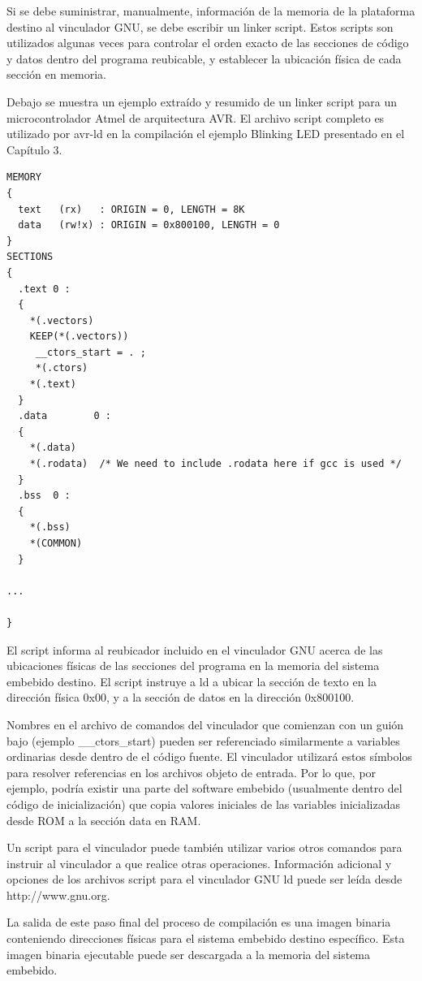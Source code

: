 \documentclass[12pt]{article}
\begin{document}
Si se debe suministrar, manualmente, información de la memoria de la plataforma destino
al vinculador  GNU, se debe escribir un linker script.
Estos scripts son utilizados algunas veces para controlar el orden exacto de
las secciones de código y datos dentro del programa reubicable, y establecer
la ubicación física de cada sección en memoria.


Debajo se muestra un ejemplo extraído y resumido de un linker script
para un microcontrolador Atmel de arquitectura AVR. El archivo script
completo es utilizado por avr-ld en la compilación el ejemplo Blinking LED
presentado en el Capítulo 3.

\begin{verbatim}
MEMORY
{
  text   (rx)   : ORIGIN = 0, LENGTH = 8K
  data   (rw!x) : ORIGIN = 0x800100, LENGTH = 0
}
SECTIONS
{
  .text 0 :
  {
    *(.vectors)
    KEEP(*(.vectors))
     __ctors_start = . ;
     *(.ctors)
    *(.text)
  }
  .data        0 :
  {
    *(.data)
    *(.rodata)  /* We need to include .rodata here if gcc is used */
  }
  .bss  0 :
  {
    *(.bss)
    *(COMMON)
  }

...

}
\end{verbatim}

El script informa al reubicador incluido en el vinculador GNU acerca de las ubicaciones
físicas de las secciones del programa en la memoria del sistema embebido destino.
El script instruye a ld a ubicar la sección de texto en la dirección física 0x00,
y a la sección de datos en la dirección 0x800100.

Nombres en el archivo de comandos del vinculador que comienzan con un guión bajo
(ejemplo \_\_ctors\_start) pueden ser referenciado similarmente a variables ordinarias
desde dentro de el código fuente. El vinculador utilizará estos símbolos
para resolver referencias en los archivos objeto de entrada.
Por lo que, por ejemplo, podría existir una parte del software embebido (usualmente
dentro del código de inicialización) que copia valores iniciales de las variables
inicializadas desde ROM a la sección data en RAM.

Un script para el vinculador puede también utilizar varios otros comandos
para instruir al vinculador a que realice otras operaciones.
Información adicional y opciones de los archivos script para el vinculador GNU ld
puede ser leída desde http://www.gnu.org.

La salida de este paso final del proceso de compilación es una imagen binaria
conteniendo direcciones físicas para el sistema embebido destino específico.
Esta imagen binaria ejecutable puede ser descargada a la memoria del sistema embebido.
\end{document}
